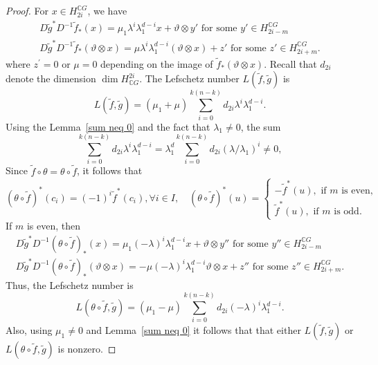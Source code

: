 \documentclass{amsart}
\newcommand{\lemref}[1]{Lemma~\ref{#1}}
\begin{document}
\begin{proof}
	For $x\in H_{2i}^{\mathbb{C}G}$, we have 
	\begin{equation*}\label{D cal}
		\begin{split}
			D\tilde g^* D^{-1} \tilde f_*(x)=\mu_1 \lambda^i\lambda_1^{d-i} x + \vartheta\otimes y'\text{ for some }y' \in H^{\mathbb CG}_{2i-m}\\
			D\tilde g^* D^{-1} \tilde f_*(\vartheta\otimes x)= \mu \lambda^i\lambda_1^{d-i}(\vartheta\otimes x)+z' \text{ for some }z'\in H_{2i+m}^{\mathbb CG}.
		\end{split}
	\end{equation*}
	where $z^{'} =0$ or $\mu =0$ depending on the image of $\tilde{f}_*(\vartheta \otimes x)$.
	Recall that  $d_{2i}$ denote the dimension $\dim H^{2i}_{\mathbb CG}$. The Lefschetz number  $L(\tilde{f},\tilde g)$ is
	\begin{equation*}\label{L(f,g)}
		L(\tilde f,\tilde g) =(\mu_1 + \mu) \sum_{i=0}^{k(n-k)} d_{2i} \lambda^i\lambda_1^{d-i}.
	\end{equation*}
	Using the \lemref{sum neq 0} and the fact that $\lambda_1\neq 0$, the sum
	\[
	\sum_{i=0}^{k(n-k)} d_{2i} \lambda^i\lambda_1^{d-i}=\lambda_1^d\sum_{i=0}^{k(n-k)} d_{2i} (\lambda/\lambda_1)^i\neq 0,
	\]
	Since $\tilde f\circ\theta=\theta\circ \tilde f$, it follows that $$(\theta\circ \tilde  f )^*(c_i)= (-1)^i \tilde{f}^*(c_i), \forall i \in I, \quad (\theta \circ\tilde  f)^*(u)=\begin{cases}
		-\tilde  f^*(u), \text{ if } m \text{ is even,}\\
		\tilde  f^*(u), \text{ if } m \text{ is odd}.
	\end{cases}$$ 
	If $m$ is even, then  
	\begin{equation*}\label{D with theta}
		\begin{split}
			D\tilde g^* D^{-1} (\theta\circ \tilde f)_*(x)=\mu_1(- \lambda)^i\lambda_1^{d-i} x + \vartheta\otimes y''\text{ for some }y'' \in H^{\mathbb CG}_{2i-m} \\
			D\tilde g^* D^{-1} (\theta\circ \tilde f)_*(\vartheta\otimes x)= -\mu (-\lambda)^i\lambda_1^{d-i}\vartheta\otimes x+z'' \text{ for some }z''\in H_{2i+m}^{\mathbb CG}.
		\end{split}
	\end{equation*}
	Thus,  the Lefschetz number is
	\begin{equation*}\label{L(theta f,g)}
		L(\theta \circ\tilde f,\tilde g) =(\mu_1 - \mu)\sum_{i=0}^{k(n-k)} d_{2i} (-\lambda)^i\lambda_1^{d-i}.
	\end{equation*}
	Also, using  $\mu_1\neq 0$ and \lemref{sum neq 0}  it follows that that either $L(\tilde f, \tilde g)$ or $L(\theta\circ \tilde f,\tilde g)$ is nonzero. 
	

\end{proof}
\end{document}
